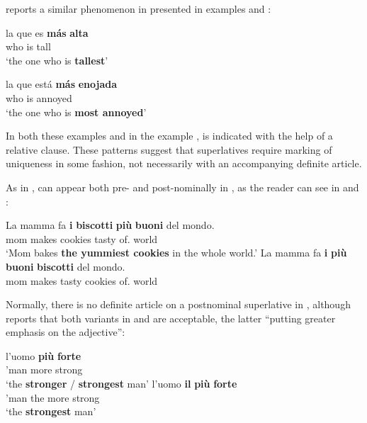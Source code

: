 \documentclass[output=paper
,modfonts
,nonflat]{langsci/langscibook}
\begin{document}
\citet[75]{Matushansky2008} reports a similar phenomenon in  presented in examples  and :

\ea \label{ex:coppockstrand:56}
\gll la que es \textbf{m\'as} \textbf{alta}\\
 who is \cmpr{} tall\\ 
\glt`the one who is \textbf{tallest}'
\z

\ea \label{ex:coppockstrand:57}
\gll la que est\'a \textbf{m\'as} \textbf{enojada}\\
 who is \cmpr{} annoyed\\ 
\glt `the one who is \textbf{most annoyed}'
\z

In both these examples and in the  example ,  is indicated with the help of a relative clause. These patterns suggest that superlatives require marking of uniqueness in some fashion, not necessarily with an accompanying definite article.

As in ,  can appear both pre- and post-nominally in , as the reader can see in  and :

\ea \label{ex:coppockstrand:58}
\begin{xlist}
\ex \label{ex:coppockstrand:58a}
\gll La mamma fa \textbf{i} \textbf{biscotti} \textbf{più} \textbf{buoni} del mondo. \\
 mom makes  cookies \cmpr{} tasty of. world\\  
\glt `Mom bakes \textbf{the yummiest cookies} in the whole world.'
\ex \label{ex:coppockstrand:58b}
\gll La mamma fa \textbf{i} \textbf{più} \textbf{buoni} \textbf{biscotti} del mondo. \\
 mom makes  \cmpr{} tasty cookies of. world\\ 
\end{xlist}
\z

Normally, there is no definite article on a postnominal superlative in , although \citet{Plank2003} reports that both variants in  and  are acceptable, the latter ``putting greater emphasis on the adjective'':

\ea \label{ex:coppockstrand:59}
\begin{xlist}
\ex \label{ex:coppockstrand:59a}
\gll l'uomo \textbf{pi\`u} \textbf{forte}\\
'man more strong\\ 
\glt `the \textbf{stronger} / \textbf{strongest} man'
\ex \label{ex:coppockstrand:59b}
\gll l'uomo \textbf{il} \textbf{pi\`u} \textbf{forte}\\
'man the more strong\\
\glt`the \textbf{strongest} man'
\end{xlist}
\z
\end{document}
